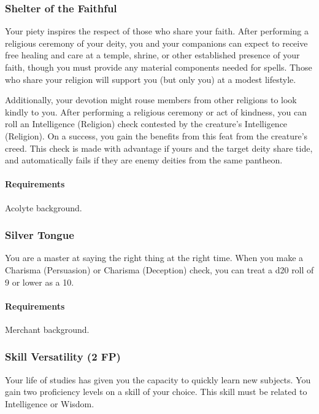 \subsubsection{Shelter of the Faithful} \label{feat::shelterofthefaithful}
    Your piety inspires the respect of those who share your faith.
    After performing a religious ceremony of your deity, you and your companions can expect to receive free healing and care at a temple, shrine, or other established presence of your faith, though you must provide any material components needed for spells.
    Those who share your religion will support you (but only you) at a modest lifestyle.

    Additionally, your devotion might rouse members from other religions to look kindly to you.
    After performing a religious ceremony or act of kindness, you can roll an Intelligence (Religion) check contested by the creature's Intelligence (Religion).
    On a success, you gain the benefits from this feat from the creature's creed.
    This check is made with advantage if yours and the target deity share tide, and automatically fails if they are enemy deities from the same pantheon.

    \paragraph{Requirements} Acolyte background.
\subsubsection{Silver Tongue} \label{feat::silvertongue}
    You are a master at saying the right thing at the right time.
    When you make a Charisma (Persuasion) or Charisma (Deception) check, you can treat a d20 roll of 9 or lower as a 10.
    \paragraph{Requirements} Merchant background.
\subsubsection{Skill Versatility (2 FP)} \label{feat::skillversatility}
    Your life of studies has given you the capacity to quickly learn new subjects.
    You gain two proficiency levels on a skill of your choice.
    This skill must be related to Intelligence or Wisdom.

